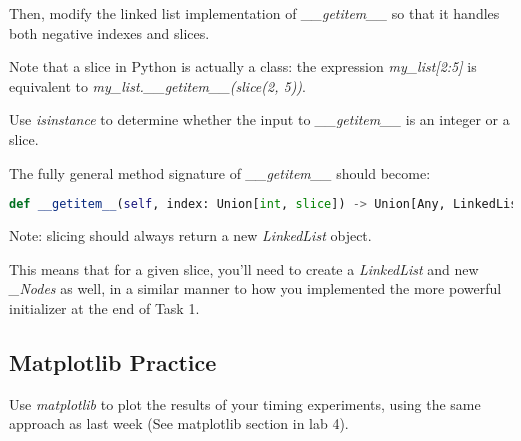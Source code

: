 \documentclass[12pt]{article}
\begin{document}
\bigskip

\noindent Then, modify the linked list implementation of \textit{\_\_getitem\_\_}
so that it handles both negative indexes and slices.

\bigskip

\noindent Note that a slice in Python is actually a class: the expression
\textit{my\_list[2:5]} is equivalent to \textit{my\_list.\_\_getitem\_\_(slice(2, 5))}.

\bigskip

\noindent Use \textit{isinstance} to determine whether the input to \textit{\_\_getitem\_\_}
is an integer or a slice.

\bigskip

\noindent The fully general method signature of \textit{\_\_getitem\_\_} should
become:

\bigskip

\begin{lstlisting}[language=python]
    def __getitem__(self, index: Union[int, slice]) -> Union[Any, LinkedList]
\end{lstlisting}

\bigskip

\noindent Note: slicing should always return a new \textit{LinkedList} object.

\bigskip

\noindent This means that for a given slice, you’ll need to create a \textit{LinkedList} and new
\textit{\_Nodes} as well, in a similar manner to how you implemented the more
powerful initializer at the end of Task 1.


\subsection*{Matplotlib Practice}
Use \textit{matplotlib} to plot the results of your timing experiments, using the same
approach as last week (See matplotlib section in lab 4).
\end{document}
